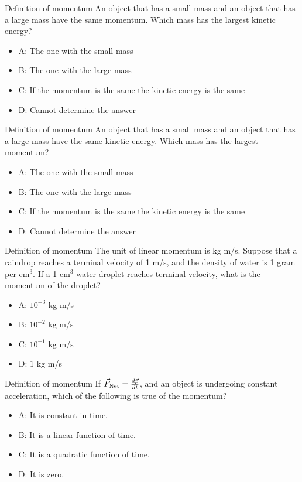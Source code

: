 \documentclass{beamer}
\begin{document}
\begin{frame}{Definition of momentum}
An object that has a small mass and an object that has a large mass have the same momentum. Which mass has the largest kinetic energy?
\begin{itemize}
\item A: The one with the small mass
\item B: The one with the large mass
\item C: If the momentum is the same the kinetic energy is the same
\item D: Cannot determine the answer
\end{itemize}
\end{frame}

\begin{frame}{Definition of momentum}
An object that has a small mass and an object that has a large mass have the same kinetic energy. Which mass has the largest momentum?
\begin{itemize}
\item A: The one with the small mass
\item B: The one with the large mass
\item C: If the momentum is the same the kinetic energy is the same
\item D: Cannot determine the answer
\end{itemize}
\end{frame}

\begin{frame}{Definition of momentum}
The unit of linear momentum is kg m/s.  Suppose that a raindrop reaches a terminal velocity of 1 m/s, and the density of water is 1 gram per cm$^3$.  If a 1 cm$^3$ water droplet reaches terminal velocity, what is the momentum of the droplet?
\begin{itemize}
\item A: $10^{-3}$ kg m/s
\item B: $10^{-2}$ kg m/s
\item C: $10^{-1}$ kg m/s
\item D: $1$ kg m/s
\end{itemize}
\end{frame}

\begin{frame}{Definition of momentum}
If $\vec{F}_{\rm Net} = \frac{d\vec{p}}{dt}$, and an object is undergoing constant acceleration, which of the following is true of the momentum?
\begin{itemize}
\item A: It is constant in time.
\item B: It is a linear function of time.
\item C: It is a quadratic function of time.
\item D: It is zero.
\end{itemize}
\end{frame}
\end{document}
